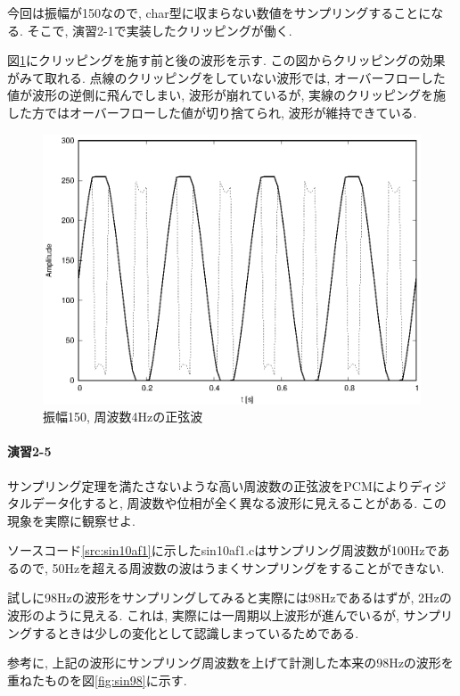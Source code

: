 \documentclass[titlepage]{jsarticle}
\begin{document}
        今回は振幅が150なので, char型に収まらない数値をサンプリングすることになる.
        そこで, 演習2-1で実装したクリッピングが働く.

        図\ref{fig:sin150f4}にクリッピングを施す前と後の波形を示す.
        この図からクリッピングの効果がみて取れる.
        点線のクリッピングをしていない波形では, オーバーフローした値が波形の逆側に飛んでしまい,
        波形が崩れているが, 実線のクリッピングを施した方ではオーバーフローした値が切り捨てられ, 波形が維持できている.
        
        \begin{figure}[ht]
            \centering
            \includegraphics[width=12cm]{images/sin150f4.eps}
            \caption{振幅150, 周波数4Hzの正弦波}
            \label{fig:sin150f4}
        \end{figure}

    \paragraph{演習2-5} サンプリング定理を満たさないような高い周波数の正弦波をPCMによりディジタルデータ化すると,
    周波数や位相が全く異なる波形に見えることがある. この現象を実際に観察せよ.

        ソースコード\ref{src:sin10af1}に示したsin10af1.cはサンプリング周波数が100Hzであるので,
        50Hzを超える周波数の波はうまくサンプリングをすることができない.

        試しに98Hzの波形をサンプリングしてみると実際には98Hzであるはずが, 2Hzの波形のように見える.
        これは, 実際には一周期以上波形が進んでいるが, サンプリングするときは少しの変化として認識しまっているためである.
        
        参考に, 上記の波形にサンプリング周波数を上げて計測した本来の98Hzの波形を重ねたものを図\ref{fig:sin98}に示す.
\end{document}
